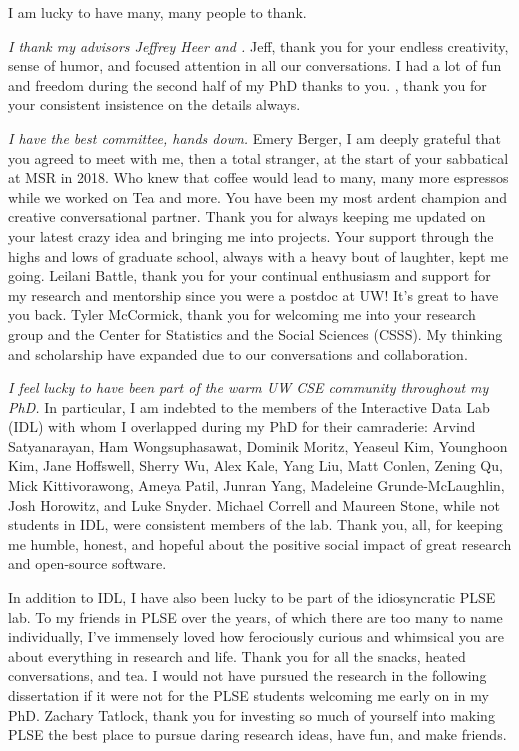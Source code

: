 \small
I am lucky to have many, many people to thank. 

\textit{I thank my advisors Jeffrey Heer and \reneJust.} Jeff, thank you for
your endless creativity, sense of humor, and focused attention in all our
conversations. I had a lot of fun and freedom during the second half of my PhD
thanks to you. \rene, thank you for your consistent insistence on the details
always.

\textit{I have the best committee, hands down.} Emery Berger, I am deeply grateful
that you agreed to meet with me, then a total stranger, at the start of your
sabbatical at MSR in 2018. Who knew that coffee would lead to many, many
more espressos while we worked on Tea and more. You have been my most ardent
champion and creative conversational partner. Thank you for always keeping
me updated on your latest crazy idea and bringing me into projects. Your
support through the highs and lows of graduate school, always with a heavy
bout of laughter, kept me going. 
Leilani Battle, thank you for your continual enthusiasm and support for my
research and mentorship since you were a postdoc at UW! It's great to have you back.    
Tyler McCormick, thank you for welcoming me into your research group and the
Center for Statistics and the Social Sciences (CSSS). My thinking and
scholarship have expanded due to our conversations and collaboration. 

\textit{I feel lucky to have been part of the warm UW CSE community throughout
my PhD.} In particular, I am indebted to the members of the Interactive Data Lab
(IDL) with whom I overlapped during my PhD for their camraderie: Arvind
Satyanarayan, Ham Wongsuphasawat, Dominik Moritz, Yeaseul Kim, Younghoon Kim,
Jane Hoffswell, Sherry Wu, Alex Kale, Yang Liu, Matt Conlen, Zening Qu, Mick
Kittivorawong, Ameya Patil, Junran Yang, Madeleine Grunde-McLaughlin, Josh
Horowitz, and Luke Snyder. Michael Correll and Maureen Stone, while not students
in IDL, were consistent members of the lab. Thank you, all, for keeping me
humble, honest, and hopeful about the positive social impact of great research
and open-source software.

In addition to IDL, I have
also been lucky to be part of the idiosyncratic PLSE lab. To my friends in
PLSE over the years, of which there are too many to name individually, I've
immensely loved how ferociously curious and whimsical you are about
everything in research and life. Thank you for all the snacks, heated
conversations, and tea. I would not have pursued the research in the
following dissertation if it were not for the PLSE students welcoming me
early on in my PhD. Zachary Tatlock, thank you for investing so
much of yourself into making PLSE the best place to pursue daring research
ideas, have fun, and make friends. 

